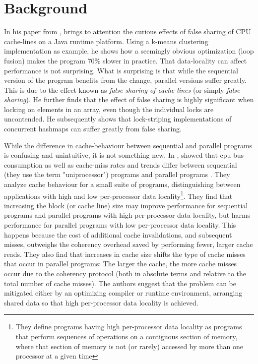 \chapter{Background}
In his paper \cite{mystery} from \citeyear{mystery}, \citeauthor{mystery} brings
to attention the curious effects of false sharing of CPU cache-lines on a Java
runtime platform. Using a k-means clustering implementation as example, he shows
how a seemingly obvious optimization (loop fusion) makes the program 70\% slower
in practice. That data-locality can affect performance is not surprising.
What is surprising is that while the sequential version of the program benefits
from the change, parallel versions suffer greatly. This is due to the effect
known as \textit{false sharing of cache lines} (or simply \textit{false
sharing}). He further finds that the effect of false sharing is highly
significant when locking on elements in an array, even though the individual
locks are uncontended. He subsequently shows that lock-striping implementations
of concurrent hashmaps can suffer greatly from false sharing.

While the difference in cache-behaviour between sequential and parallel programs
is confusing and unintuitive, it is not something new. In \citeyear{eggersbus},
\citeauthor{eggersbus} showed that cpu bus consumption as well as cache-miss
rates and trends differ between sequential (they use the term "uniprocessor")
programs and parallel programs \cite{eggersbus}.
They analyze cache behaviour for a small suite of programs, distinguishing
between applications with high and low per-processor data locality\footnote{They
define programs having high per-processor data locality as programs that perform
sequences of operations on a contiguous section of memory, where that section of
memory is not (or rarely) accessed by more than one processor at a given time}.
They find that increasing the block (or cache line) size may improve
performance for sequential programs and parallel programs with high
per-processor data locality, but harms performance for parallel programs with
low per-processor data locality. This happens because the cost of additional cache
invalidations, and subsequent misses, outweighs the coherency overhead saved by
performing fewer, larger cache reads. They also find that increases in cache
size shifts the type of cache misses that occur in parallel programs: The larger
the cache, the more cache misses occur due to the coherency protocol (both in
absolute terms and relative to the total number of cache misses). The authors
suggest that the problem can be mitigated either by an optimizing compiler or
runtime environment, arranging shared data so that high per-processor data
locality is achieved.

